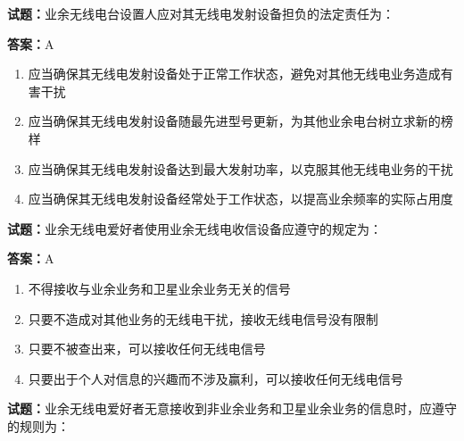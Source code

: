 \documentclass{ctexbook}
\begin{document}
\vspace{1em}

\textbf{试题：}业余无线电台设置人应对其无线电发射设备担负的法定责任为： 

\textbf{答案：}A 

\begin{enumerate}[leftmargin=3em]
  \item 应当确保其无线电发射设备处于正常工作状态，避免对其他无线电业务造成有害干扰 

  \item 应当确保其无线电发射设备随最先进型号更新，为其他业余电台树立求新的榜样 

  \item 应当确保其无线电发射设备达到最大发射功率，以克服其他无线电业务的干扰 

  \item 应当确保其无线电发射设备经常处于工作状态，以提高业余频率的实际占用度 

\end{enumerate}





\vspace{1em}

\textbf{试题：}业余无线电爱好者使用业余无线电收信设备应遵守的规定为： 

\textbf{答案：}A 

\begin{enumerate}[leftmargin=3em]
  \item 不得接收与业余业务和卫星业余业务无关的信号 

  \item 只要不造成对其他业务的无线电干扰，接收无线电信号没有限制 

  \item 只要不被查出来，可以接收任何无线电信号 

  \item 只要出于个人对信息的兴趣而不涉及赢利，可以接收任何无线电信号 

\end{enumerate}





\vspace{1em}

\textbf{试题：}业余无线电爱好者无意接收到非业余业务和卫星业余业务的信息时，应遵守的规则为： 
\end{document}
